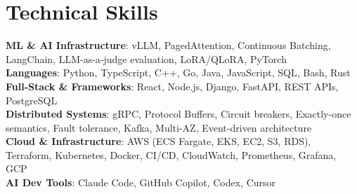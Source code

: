 \documentclass[letterpaper,11pt]{article}
\begin{document}
\section{Technical Skills}
\vspace{-7pt}
\begin{itemize}
[leftmargin=0.15in, label={}]\small{\item{
        \textbf{ML \& AI Infrastructure}{: vLLM, PagedAttention, Continuous Batching, LangChain, LLM-as-a-judge evaluation, LoRA/QLoRA, PyTorch} \\
        \textbf{Languages}{: Python, TypeScript, C++, Go, Java, JavaScript, SQL, Bash, Rust} \\
        \textbf{Full-Stack \& Frameworks}{: React, Node.js, Django, FastAPI, REST APIs, PostgreSQL} \\
        \textbf{Distributed Systems}{: gRPC, Protocol Buffers, Circuit breakers, Exactly-once semantics, Fault tolerance, Kafka, Multi-AZ, Event-driven architecture} \\
        \textbf{Cloud \& Infrastructure}{: AWS (ECS Fargate, EKS, EC2, S3, RDS), Terraform, Kubernetes, Docker, CI/CD, CloudWatch, Prometheus, Grafana, GCP} \\
        \textbf{AI Dev Tools}{: Claude Code, GitHub Copilot, Codex, Cursor} \\
}}
\end{itemize}
\end{document}
